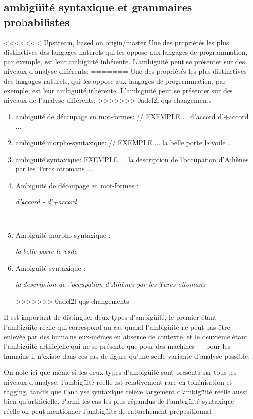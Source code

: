 \documentclass[12pt]{article}
\begin{document}
\subsection{ambig\"uit\'e syntaxique et grammaires probabilistes}

<<<<<<< Upstream, based on origin/master
Une des propri\'et\'es les plus distinctives des langages naturels qui les
oppose aux langages de programmation, par exemple, est leur ambig\"uit\'e inh\'erente. L'ambig\"uit\'e peut se pr\'esenter sur des niveaux d'analyse diff\'erents:
=======
Une des propri\'et\'es les plus distinctives des langages naturels, qui les
oppose aux langages de programmation, par exemple, est leur ambiguit\'e
inh\'erente. L'ambiguit\'e peut se pr\'esenter sur des niveaux de l'analyse
diff\'erents:
>>>>>>> 0adef2f qqs changements
\begin{enumerate}
<<<<<<< Upstream, based on origin/master
\item ambig\"uit\'e de d\'ecoupage en mot-formes:
//
EXEMPLE ... d'accord d'+accord ...
\item ambig\"uit\'e morpho-syntaxique:
//
EXEMPLE ... la belle porte le voile ...
\item ambig\"uit\'e syntaxique:
EXEMPLE ... la description de l'occupation d'Ath\`enes par les Turcs ottomans ... 
=======
\item Ambiguit\'e de d\'ecoupage en mot-formes :\\
\centerline{\textit{d'accord - d'+accord}}\\
\item Ambiguit\'e morpho-syntaxique :\\
\centerline{\textit{la belle porte le voile}}
\item Ambiguit\'e syntaxique :\\
\centerline{\textit{la description de l'occupation d'Ath\`enes par les Turcs
ottomans}}
>>>>>>> 0adef2f qqs changements
\end{enumerate}

Il est important de distinguer deux types d'ambig\"uit\'e, le
premier \'etant l'ambig\"uit\'e r\'eelle qui correspond au cas quand l'ambig\"uit\'e
ne peut pas \^etre enlev\'ee par des humains eux-m\^emes en absence de contexte,
et le deuxi\`eme \'etant l'ambig\"uit\'e artificielle qui ne se pr\'esente que pour des machines --- pour les humains il n'existe dans ces cas de figure qu'une seule variante d'analyse possible.

On note ici que m\^eme si les deux types d'ambig\"uit\'e sont pr\'esents sur tous les niveaux d'analyse, l'ambig\"uit\'e r\'eelle est relativement rare en tok\'enisation et tagging, tandis que l'analyse syntaxique
rel\`eve largement d'ambig\"uit\'e r\'eelle aussi bien qu'artificielle. Parmi les cas les plus r\'epandus de l'ambig\"uit\'e syntaxique r\'eelle on peut mentionner l'ambig\"uit\'e de rattachement pr\'epositionnel : 
\end{document}
